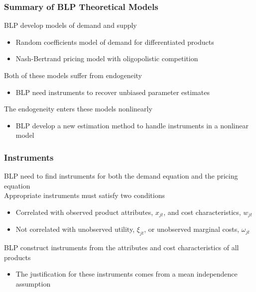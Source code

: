 \documentclass{beamer}
\begin{document}
\begin{frame}\frametitle{Summary of BLP Theoretical Models}
    BLP develop models of demand and supply
    \begin{itemize}
        \item Random coefficients model of demand for differentiated products
        \item Nash-Bertrand pricing model with oligopolistic competition
    \end{itemize}
    \vspace{2ex}
    Both of these models suffer from endogeneity
    \begin{itemize}
        \item BLP need instruments to recover unbiased parameter estimates
    \end{itemize}
    \vspace{2ex}
    The endogeneity enters these models nonlinearly
    \begin{itemize}
        \item BLP develop a new estimation method to handle instruments in a nonlinear model
    \end{itemize}
\end{frame}

\begin{frame}\frametitle{Instruments}
    BLP need to find instruments for both the demand equation and the pricing equation \\
    \vspace{2ex}
    Appropriate instruments must satisfy two conditions
    \begin{itemize}
        \item Correlated with observed product attributes, $x_{jt}$, and cost characteristics, $w_{jt}$
        \item Not correlated with unobserved utility, $\xi_{jt}$, or unobserved marginal costs, $\omega_{jt}$
    \end{itemize}
    \vspace{2ex}
    BLP construct instruments from the attributes and cost characteristics of all products
    \begin{itemize}
        \item The justification for these instruments comes from a mean independence assumption
    \end{itemize}
\end{frame}
\end{document}
